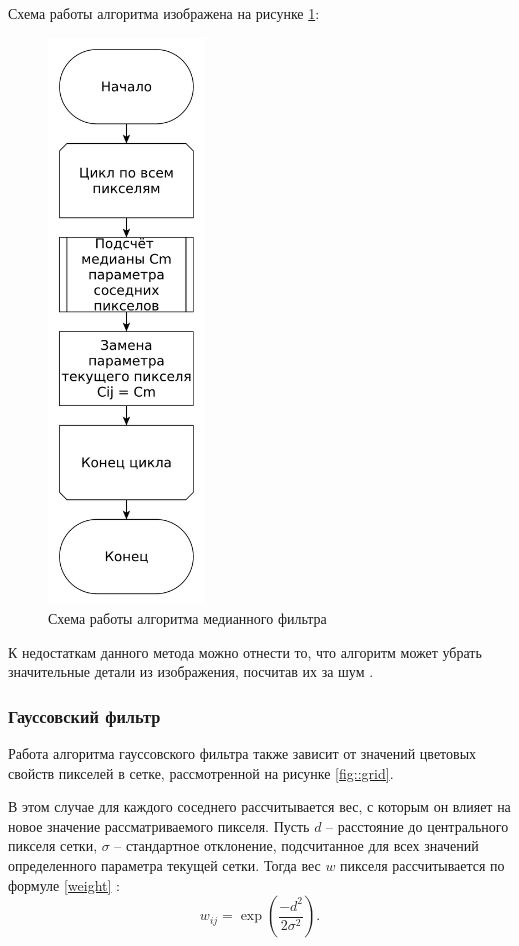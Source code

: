\newpage
Схема работы алгоритма изображена на рисунке \ref{fig::median}:
\FloatBarrier
\begin{figure}[h]	
	\begin{center}
		\includegraphics[height=15cm]{inc/pdf/median.pdf}
	\end{center}
	\captionsetup{justification=centering}
	\caption{Схема работы алгоритма медианного фильтра}
	\label{fig::median}
\end{figure}
\FloatBarrier

К недостаткам данного метода можно отнести то, что алгоритм может убрать значительные детали из изображения, посчитав их за шум \cite{median2}. 


\subsubsection{Гауссовский фильтр}
Работа алгоритма гауссовского фильтра также зависит от значений цветовых свойств пикселей в сетке, рассмотренной на рисунке \ref{fig::grid}.

В этом случае для каждого соседнего рассчитывается вес, с которым он влияет на новое значение рассматриваемого пикселя. 
Пусть $d$ -- расстояние до центрального пикселя сетки, $\sigma$ -- стандартное отклонение, подсчитанное для всех значений определенного параметра текущей сетки.
Тогда вес $w$ пикселя рассчитывается по формуле \eqref{weight} \cite{filterTechincs}:
\begin{equation}
	\label{weight}
	w_{ij} = \exp\left(\frac{-d^2}{2\sigma^2}\right).
\end{equation}

